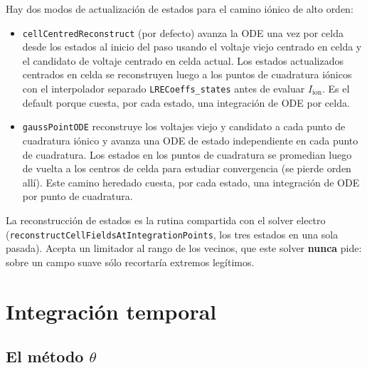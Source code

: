 \documentclass[11pt,a4paper]{article}
\newcommand{\code}[1]{\texttt{\small #1}}
\newcommand{\Iion}{I_{\mathrm{ion}}}
\begin{document}
Hay dos modos de actualización de estados para el camino iónico de alto orden:
\begin{itemize}
\item \code{cellCentredReconstruct} (por defecto) avanza la ODE una vez por celda desde los
estados al inicio del paso usando el voltaje viejo centrado en celda y el candidato de
voltaje centrado en celda actual. Los estados actualizados centrados en celda se reconstruyen
luego a los puntos de cuadratura iónicos con el interpolador separado
\code{LRECoeffs\_states} antes de evaluar $\Iion$. Es el default porque cuesta, por cada estado, una
integración de ODE por celda.
\item \code{gaussPointODE} reconstruye los voltajes viejo y candidato a cada punto de
cuadratura iónico y avanza una ODE de estado independiente en cada punto de cuadratura. Los
estados en los puntos de cuadratura se promedian luego de vuelta a los centros de celda para estudiar convergencia (se pierde orden allí).
Este camino heredado cuesta, por cada estado, una integración de ODE por punto de cuadratura.
\end{itemize}

La reconstrucción de estados es la rutina compartida con el solver electro
(\code{reconstructCellFieldsAtIntegrationPoints}, los tres estados en una sola
pasada). Acepta un limitador al rango de los vecinos, que este solver
\textbf{nunca} pide: sobre un campo suave sólo recortaría extremos legítimos.

\section{Integración temporal}

\subsection{El método \texorpdfstring{$\theta$}{theta}}
\end{document}
